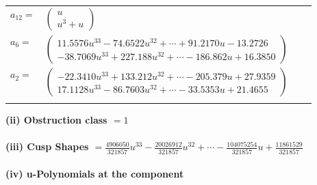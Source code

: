\documentclass[1p]{elsarticle_modified}
\theoremstyle{definition}
\begin{document}
\begin{tabular}{m{7pt} m{180pt} m{7pt} m{180pt} }
\flushright $a_{12}=$&$\begin{pmatrix}u\\u^3+u\end{pmatrix}$ \\
\flushright $a_{6}=$&$\begin{pmatrix}11.5576 u^{33}-74.6522 u^{32}+\cdots+91.2170 u-13.2726\\-38.7069 u^{33}+227.188 u^{32}+\cdots-186.862 u+16.3850\end{pmatrix}$ \\
\flushright $a_{2}=$&$\begin{pmatrix}-22.3410 u^{33}+133.212 u^{32}+\cdots-205.379 u+27.9359\\17.1128 u^{33}-86.7603 u^{32}+\cdots-33.5353 u+21.4655\end{pmatrix}$\\&\end{tabular}
\flushleft \textbf{(ii) Obstruction class $= 1$}\\~\\
\flushleft \textbf{(iii) Cusp Shapes $= \frac{4906050}{321857} u^{33}-\frac{20026912}{321857} u^{32}+\cdots-\frac{104075254}{321857} u+\frac{11861529}{321857}$}\\~\\
\newpage\renewcommand{\arraystretch}{1}
\flushleft \textbf{(iv) u-Polynomials at the component}\newline \\
\end{document}
